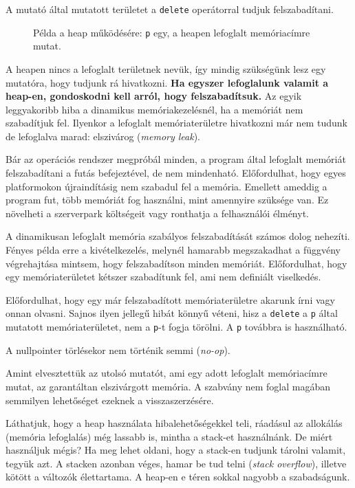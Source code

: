 \documentclass[../cpp_book/cpp_book.tex]{subfiles}
\begin{document}
	A mutató által mutatott területet a \texttt{delete} operátorral tudjuk felszabadítani.
	\begin{figure}[!h]
		\centering
		
		
		\caption{Példa a heap működésére: \texttt{p} egy, a heapen lefoglalt memóriacímre mutat.}\label{fig_heap_example}
	\end{figure}
	
	A heapen nincs a lefoglalt területnek nevük, így mindig szükségünk lesz egy mutatóra, hogy tudjunk rá hivatkozni. \textbf{Ha egyszer lefoglalunk valamit a heap-en, gondoskodni kell arról, hogy felszabadítsuk.} Az egyik leggyakoribb hiba a dinamikus memóriakezelésnél, ha a memóriát nem szabadítjuk fel. Ilyenkor a lefoglalt memóriaterületre hivatkozni már nem tudunk de lefoglalva marad: elszivárog (\textit{memory leak}). 
	\smallskip
	
	Bár az operációs rendszer megpróbál minden, a program által lefoglalt memóriát felszabadítani a futás befejeztével, de nem mindenható. Előfordulhat, hogy egyes platformokon újraindításig nem szabadul fel a memória. Emellett ameddig a program fut, több memóriát fog használni, mint amennyire szüksége van. Ez növelheti a szerverpark költségeit vagy ronthatja a felhasználói élményt.
	\medskip
	
	A dinamikusan lefoglalt memória szabályos felszabadítását számos dolog nehezíti. Fényes példa erre a kivételkezelés, melynél hamarabb megszakadhat a függvény végrehajtása mintsem, hogy felszabadítson minden memóriát. Előfordulhat, hogy egy memóriaterületet kétszer szabadítunk fel, ami nem definiált viselkedés.
	\medskip
	
  Előfordulhat, hogy egy már felszabadított memóriaterületre akarunk írni vagy onnan olvasni. Sajnos ilyen jellegű hibát könnyű véteni, hisz a \texttt{delete} a \texttt{p} által mutatott memóriaterületet, nem a \texttt{p}-t fogja törölni. A \texttt{p} továbbra is használható.
	\begin{note}
		A nullpointer törlésekor nem történik semmi (\textit{no-op}).
	\end{note}
	\begin{note}
		Amint elvesztettük az utolsó mutatót, ami egy adott lefoglalt memóriacímre mutat, az garantáltan elszivárgott memória. A szabvány nem foglal magában semmilyen lehetőséget ezeknek a visszaszerzésére.
	\end{note}
	Láthatjuk, hogy a heap használata hibalehetőségekkel teli, ráadásul az allokálás (memória lefoglalás) még lassabb is, mintha a stack-et használnánk. De miért használjuk mégis? Ha meg lehet oldani, hogy a stack-en tudjunk tárolni valamit, tegyük azt. A stacken azonban véges, hamar be tud telni (\textit{stack overflow}), illetve kötött a változók élettartama. A heap-en e téren sokkal nagyobb a szabadságunk.
\end{document}
